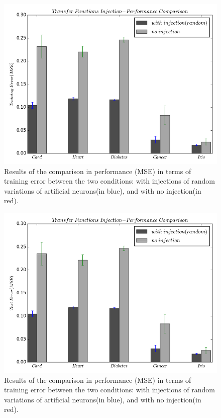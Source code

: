 \documentclass[12pt]{article} %
\begin{document}
\begin{figure}[here]
 \includegraphics[scale=0.6]{errs_comp_inject_train.png}
 \caption{\label{comparison_injection} Results of the comparison in performance (MSE) in terms of training error between the two conditions: with injections of random variations of artificial neurons(in blue), and with no injection(in red).}
\end{figure}

\begin{figure}[here]
 \includegraphics[scale=0.6]{errs_comp_inject_test.png}
 \caption{\label{comparison_injection} Results of the comparison in performance (MSE) in terms of training error between the two conditions: with injections of random variations of artificial neurons(in blue), and with no injection(in red).}
\end{figure}
\end{document}
